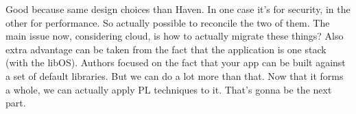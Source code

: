 Good because same design choices than Haven.
In one case it's for security, in the other for performance.
So actually possible to reconcile the two of them.
The main issue now, considering cloud, is how to actually migrate these things?
Also extra advantage can be taken from the fact that the application is one stack (with the libOS).
Authors focused on the fact that your app can be built against a set of default libraries.
But we can do a lot more than that. Now that it forms a whole, we can actually apply PL techniques to it.
That's gonna be the next part.
